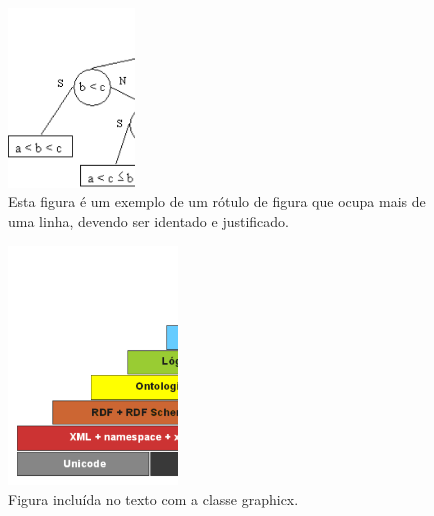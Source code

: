 \begin{figure}[H]
 \centering
 \includegraphics[width=0.30\textwidth]{./fig/exemploFig2}
 \caption{Esta figura é um exemplo de um rótulo de figura que ocupa mais de uma linha, devendo ser identado e justificado.}
 \label{fig:exemploFig2}
\end{figure}

\begin{figure}[H]
 \centering
  \includegraphics[width=0.40\textwidth]{./fig/exemploFig3}
  \caption{Figura incluída no texto com a classe graphicx.}
 \label{fig:exemploFig3}
\end{figure}

